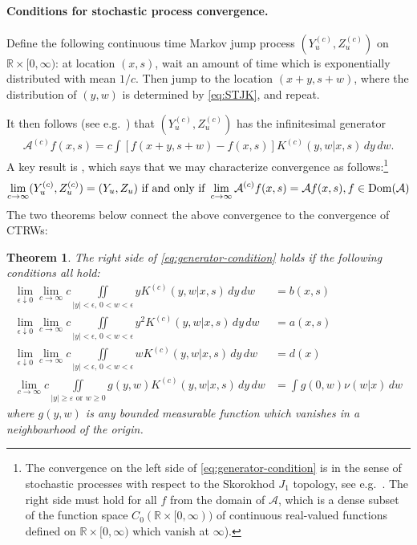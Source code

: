 \documentclass[a4paper,12pt]{article}
\numberwithin{equation}{section}
\theoremstyle{plain}
\newtheorem{theorem}{Theorem}[section]
\theoremstyle{definition}
\theoremstyle{remark}
\numberwithin{equation}{section}
\newcommand{\spc}{\mathbb R}
\newcommand{\spctim}{\spc \times [0,\infty)}
\newcommand{\1}{\mathbf 1}
\begin{document}
\paragraph{Conditions for stochastic process convergence.}
Define the following continuous time Markov jump process $(Y^{(c)}_u, Z^{(c)}_u)$ on 
$\spctim$: at location $(x,s)$, wait an amount of time which is exponentially distributed with mean $1/c$. Then jump to the location $(x+y, s+w)$, where the distribution of $(y,w)$ is determined by \eqref{eq:STJK}, and repeat. 

It then follows (see e.g.\ \cite[Proposition 17.2]{Kallenberg}) that 
$(Y^{(c)}_u, Z^{(c)}_u)$ has the infinitesimal generator
\begin{align} \label{eq:jump-process-generator}
\mathcal A^{(c)} f(x,s) = c \int [f(x+y, s+w) - f(x,s)] K^{(c)}(y,w | x,s)\,dy\,dw.
\end{align}
A key result is \cite[Theorem 17.25]{Kallenberg}, which says that we may characterize convergence as follows:\footnote{The convergence on the left side of \eqref{eq:generator-condition} is in the sense of stochastic processes with respect to the Skorokhod $J_1$ topology, see e.g.\ \cite{Whitt2010}. The right side must hold for all $f$ from the domain of $\mathcal A$, which is a dense subset of the function space $C_0(\spctim)$ of continuous real-valued functions defined on $\spctim$ which vanish at $\infty$).}
\begin{align} \label{eq:generator-condition}
\lim_{c \to \infty}(Y^{(c)}_u, Z^{(c)}_u) = (Y_u, Z_u)
\text{ if and only if }
\lim_{c \to \infty} \mathcal A^{(c)}f(x,s) = \mathcal A f(x,s), 
f \in {\rm Dom}(\mathcal A)
\end{align}
The two theorems below connect the above convergence to the convergence of CTRWs: 

\begin{theorem} \label{theorem1}
The right side of \eqref{eq:generator-condition} holds if the following 
conditions all hold: 
\begin{align} \label{eq:cond1}
\lim_{\epsilon \downarrow 0} \lim_{c \to \infty}
c \iint\limits_{|y|< \epsilon,\,0<  w < \epsilon} y K^{(c)}(y,w | x,s)\,dy\,dw &= b(x,s)
\\ \label{eq:cond2}
\lim_{\epsilon \downarrow 0} \lim_{c \to \infty}
c \iint\limits_{|y|< \epsilon, \,0<w < \epsilon} y^2 K^{(c)}(y,w | x,s)\,dy\,dw &= a(x,s)
\\ \label{eq:cond3}
\lim_{\epsilon \downarrow 0} \lim_{c \to \infty}
c \iint\limits_{|y|< \epsilon, \,0<w < \epsilon} w K^{(c)}(y,w | x,s)\,dy\,dw &= d(x)
\\
\label{eq:cond4}
\lim_{c \to \infty}
c \iint\limits_{|y| \ge \varepsilon \text{ or } w \ge 0} g(y,w) K^{(c)} (y,w | x,s)\,dy\,dw &= \int g(0,w) \nu(w|x)\,dw
\end{align}
where $g(y,w)$ is any bounded measurable function which vanishes in a neighbourhood of the origin. 
\end{theorem}
\end{document}
